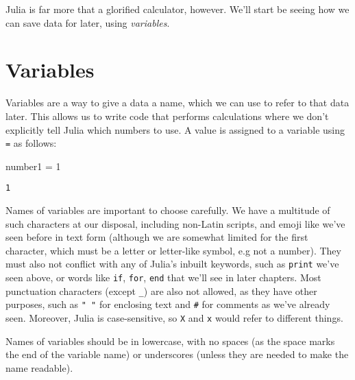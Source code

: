 \documentclass[
  letterpaper,
  DIV=11,
  numbers=noendperiod]{scrreprt}
\newenvironment{Shaded}{\begin{snugshade}}{\end{snugshade}}
\newcommand{\FloatTok}[1]{\textcolor[rgb]{0.68,0.00,0.00}{#1}}
\newcommand{\NormalTok}[1]{\textcolor[rgb]{0.00,0.23,0.31}{#1}}
\newcommand{\OperatorTok}[1]{\textcolor[rgb]{0.37,0.37,0.37}{#1}}
\begin{document}
Julia is far more that a glorified calculator, however. We'll start be
seeing how we can save data for later, using \emph{variables}.

\hypertarget{variables}{%
\section{Variables}\label{variables}}

Variables are a way to give a data a name, which we can use to refer to
that data later. This allows us to write code that performs calculations
where we don't explicitly tell Julia which numbers to use. A value is
assigned to a variable using \texttt{=} as follows:

\begin{Shaded}
\begin{Highlighting}[]
\NormalTok{number1 }\OperatorTok{=} \FloatTok{1}
\end{Highlighting}
\end{Shaded}

\begin{verbatim}
1
\end{verbatim}

Names of variables are important to choose carefully. We have a
multitude of such characters at our disposal, including non-Latin
scripts, and emoji like we've seen before in text form (although we are
somewhat limited for the first character, which must be a letter or
letter-like symbol, e.g not a number). They must also not conflict with
any of Julia's inbuilt keywords, such as \texttt{print} we've seen
above, or words like \texttt{if}, \texttt{for}, \texttt{end} that we'll
see in later chapters. Most punctuation characters (except \texttt{\_})
are also not allowed, as they have other purposes, such as \texttt{"\ "}
for enclosing text and \texttt{\#} for comments as we've already seen.
Moreover, Julia is case-sensitive, so \texttt{X} and \texttt{x} would
refer to different things.

\begin{tcolorbox}[enhanced jigsaw, toprule=.15mm, opacitybacktitle=0.6, leftrule=.75mm, breakable, coltitle=black, bottomrule=.15mm, colbacktitle=quarto-callout-tip-color!10!white, bottomtitle=1mm, rightrule=.15mm, title=\textcolor{quarto-callout-tip-color}{\faLightbulb}\hspace{0.5em}{Convention}, colframe=quarto-callout-tip-color-frame, left=2mm, colback=white, opacityback=0, arc=.35mm, toptitle=1mm, titlerule=0mm]

Names of variables should be in lowercase, with no spaces (as the space
marks the end of the variable name) or underscores (unless they are
needed to make the name readable).

\end{tcolorbox}
\end{document}
